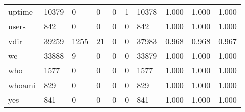 \begin{longtable}{lp{1.3cm}p{1.3cm}p{1.3cm}p{1.3cm}p{1.3cm}p{1.3cm}p{1.3cm}p{1.3cm}p{1.3cm}}
uptime    &                  10379 &                                  0 &                                 0 &                                0 &                                 1 &                           10378 &                                   1.000 &                                  1.000 &                                1.000 \\
users     &                    842 &                                  0 &                                 0 &                                0 &                                 0 &                             842 &                                   1.000 &                                  1.000 &                                1.000 \\
vdir      &                  39259 &                               1255 &                                21 &                                0 &                                 0 &                           37983 &                                   0.968 &                                  0.968 &                                0.967 \\
wc        &                  33888 &                                  9 &                                 0 &                                0 &                                 0 &                           33879 &                                   1.000 &                                  1.000 &                                1.000 \\
who       &                   1577 &                                  0 &                                 0 &                                0 &                                 0 &                            1577 &                                   1.000 &                                  1.000 &                                1.000 \\
whoami    &                    829 &                                  0 &                                 0 &                                0 &                                 0 &                             829 &                                   1.000 &                                  1.000 &                                1.000 \\
yes       &                    841 &                                  0 &                                 0 &                                0 &                                 0 &                             841 &                                   1.000 &                                  1.000 &                                1.000 \\
\end{longtable}
